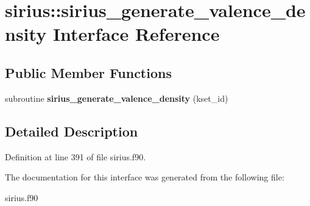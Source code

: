 \hypertarget{interfacesirius_1_1sirius__generate__valence__density}{}\section{sirius\+:\+:sirius\+\_\+generate\+\_\+valence\+\_\+density Interface Reference}
\label{interfacesirius_1_1sirius__generate__valence__density}
\subsection*{Public Member Functions}
\begin{DoxyCompactItemize}
\item 
\hypertarget{interfacesirius_1_1sirius__generate__valence__density_ae1b6ece9c18d1b2e87bbadfa2c0e8ece}{}subroutine {\bfseries sirius\+\_\+generate\+\_\+valence\+\_\+density} (kset\+\_\+id)\label{interfacesirius_1_1sirius__generate__valence__density_ae1b6ece9c18d1b2e87bbadfa2c0e8ece}

\end{DoxyCompactItemize}


\subsection{Detailed Description}


Definition at line 391 of file sirius.\+f90.



The documentation for this interface was generated from the following file\+:\begin{DoxyCompactItemize}
\item 
sirius.\+f90\end{DoxyCompactItemize}
